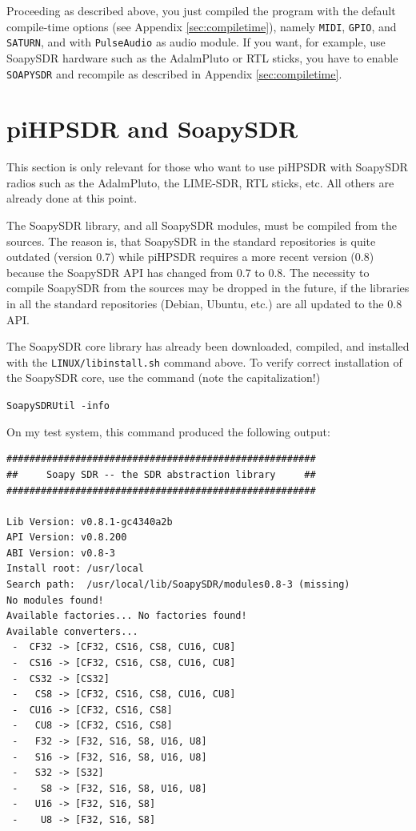 \documentclass[12pt]{book}
\def\grtt#1{\texttt{\color{magenta}#1}}
\def\pH{pi\-HPSDR\xspace}
\begin{document}
Proceeding as described above,  you  just compiled the program with
the default compile-time options (see Appendix \ref{sec:compiletime}), namely
\texttt{MIDI}, \texttt{GPIO}, and \texttt{SATURN}, and with \texttt{PulseAudio}
as audio module. If you want, for example, use SoapySDR hardware such as the AdalmPluto
or RTL sticks, you have to enable \texttt{SOAPYSDR} and recompile as described in
Appendix \ref{sec:compiletime}.

\bigskip

\section{\pH and SoapySDR}
This section is only relevant for those who want to use \pH with SoapySDR radios
such as the AdalmPluto, the LIME-SDR, RTL sticks, etc. All others are already
done at this point.

The SoapySDR library, and all SoapySDR modules, must be compiled from the sources.
The reason is, that SoapySDR in the standard repositories
is quite outdated (version 0.7) while \pH requires a more recent version (0.8) because the
SoapySDR API has changed from 0.7 to 0.8. The necessity to compile SoapySDR from the sources
may be dropped in the future, if the libraries in all the standard repositories (Debian, Ubuntu,
etc.) are all updated
to the 0.8 API.

The SoapySDR core library has already been downloaded, compiled, and installed with
the \grtt{LINUX/libinstall.sh} command above. To verify correct installation of the
SoapySDR core, use the command (note the capitalization!)

\grtt{SoapySDRUtil -info}

On my test system, this command produced the following output:

\begin{scriptsize}
\begin{verbatim}
######################################################
##     Soapy SDR -- the SDR abstraction library     ##
######################################################

Lib Version: v0.8.1-gc4340a2b
API Version: v0.8.200
ABI Version: v0.8-3
Install root: /usr/local
Search path:  /usr/local/lib/SoapySDR/modules0.8-3 (missing)
No modules found!
Available factories... No factories found!
Available converters...
 -  CF32 -> [CF32, CS16, CS8, CU16, CU8]
 -  CS16 -> [CF32, CS16, CS8, CU16, CU8]
 -  CS32 -> [CS32]
 -   CS8 -> [CF32, CS16, CS8, CU16, CU8]
 -  CU16 -> [CF32, CS16, CS8]
 -   CU8 -> [CF32, CS16, CS8]
 -   F32 -> [F32, S16, S8, U16, U8]
 -   S16 -> [F32, S16, S8, U16, U8]
 -   S32 -> [S32]
 -    S8 -> [F32, S16, S8, U16, U8]
 -   U16 -> [F32, S16, S8]
 -    U8 -> [F32, S16, S8]
\end{verbatim}
\end{scriptsize}
\end{document}
